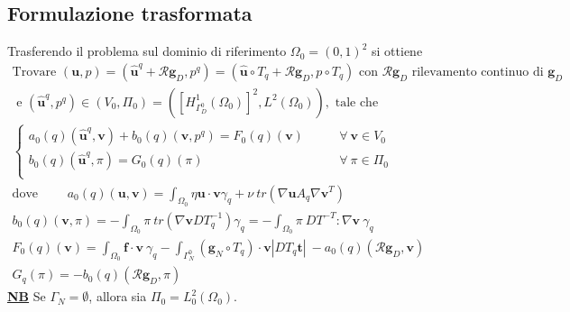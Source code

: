 \documentclass[a4paper,11pt]{article}
\theoremstyle{remark}
\begin{document}
\subsection{Formulazione trasformata}
Trasferendo il problema sul dominio di riferimento $\Omega_0=(0,1)^2$ si ottiene
\begin{equation}
\begin{split}
	\text{Trovare }(\mathbf{u},p) = (\mathbf{\hat{u}}^q+\mathcal{R}\mathbf{g}_D,p^q)=(\mathbf{\hat{u}}\circ T_q+\mathcal{R}\mathbf{g}_D,p\circ T_q) \text{ con } \mathcal{R}\mathbf{g}_D \text{ rilevamento continuo di } \mathbf{g}_D \\ \text{ e } (\mathbf{\hat{u}}^q,p^q)\in (V_0,\Pi_0) = ([H^1_{\Gamma_D^0}(\Omega_0)]^2,L^2(\Omega_0)) , \text{ tale che } \\
	\left\{
	\begin{aligned}
		a_0(q)(\mathbf{\hat{u}}^q,\mathbf{v}) + b_0(q)(\mathbf{v},p^q) = F_0(q)(\mathbf{v})\qquad&\forall\ \mathbf{v}\in V_0\\
		b_0(q)(\mathbf{\hat{u}}^q,\pi) = G_0(q)(\pi)\qquad&\forall\ \pi \in \Pi_0\\
	\end{aligned}\right.\\
\text{dove }\qquad 
		a_0(q)(\mathbf{u},\mathbf{v})=\int_{\Omega_0}{\eta \mathbf{u}\cdot\mathbf{v}\gamma_q+\nu\ tr(\nabla \mathbf{u}A_q\nabla\mathbf{v}^T)}\\
		b_0(q)(\mathbf{v},\pi) = -\int_{\Omega_0}{\pi\ tr(\nabla\mathbf{v}DT_q^{-1})\gamma_q} = -\int_{\Omega_0}{\pi\ DT^{-T}:\nabla\mathbf{v}\ \gamma_q}\\
		F_0(q)(\mathbf{v}) = \int_{\Omega_0}{ \mathbf{f}\cdot \mathbf{v}\ \gamma_q} - \int_{\Gamma_N^0} {(\mathbf{g}_N\circ T_q)\cdot\mathbf{v} |DT_q \mathbf{t}|}\ - a_0(q)(\mathcal{R}\mathbf{g}_D,\mathbf{v}) \\
		G_q(\pi)= - b_0(q)(\mathcal{R}\mathbf{g}_D,\pi)
\end{split}
\label{eq:StokesdebT}
\end{equation}
\textbf{\underline{NB}} Se $\Gamma_N=\emptyset$, allora sia $\Pi_0=L^2_0(\Omega_0)$.
\end{document}
